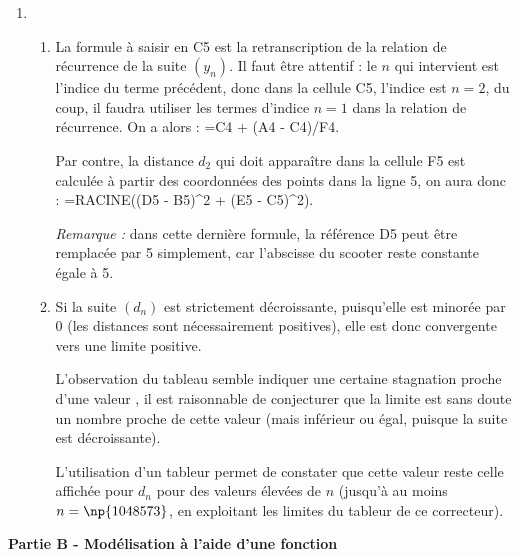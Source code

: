 \documentclass[10pt]{article}
\begin{document}
\begin{enumerate}
		\item 
		\begin{enumerate}
			\item La formule à saisir en \textsf{C5} est la retranscription de la relation de récurrence de la suite $(y_n)$. Il faut être attentif : le $n$ qui intervient est l'indice du terme précédent, donc dans la cellule \textsf{C5}, l'indice est $n=2$, du coup, il faudra utiliser les termes d'indice $n= 1$ dans la relation de récurrence. 
On a alors : \textsf{=C4 + (A4 - C4)/F4}.
			
Par contre, la distance $d_2$ qui doit apparaître dans la cellule \textsf{F5} est calculée à partir des coordonnées des points dans la ligne 5, on aura donc : \textsf{=RACINE((D5 - B5)\^{}2 + (E5 - C5)\^{}2)}.
			
\textit{Remarque :} dans cette dernière formule, la référence \textsf{D5} peut être remplacée par 5 simplement, car l'abscisse du scooter reste constante égale à 5.
			
		\item Si la suite $(d_n)$ est strictement décroissante, puisqu'elle est minorée par 0 (les distances sont nécessairement positives), elle est donc convergente vers une limite positive.
			
L'observation du tableau semble indiquer une certaine stagnation proche d'une valeur , il est raisonnable de conjecturer que la limite est sans doute un nombre proche de cette valeur (mais inférieur ou égal, puisque la suite est décroissante).
			
L'utilisation d'un tableur permet de constater que cette valeur reste celle affichée pour $d_n$ pour des valeurs élevées de $n$ (jusqu'à au moins $n = \np{1048573}$, en exploitant les limites du tableur de ce correcteur).
		\end{enumerate}
\end{enumerate}
	
\bigskip
	 
\textbf{Partie B - Modélisation à l'aide d'une fonction}
	 
	\medskip
	 
\end{document}
